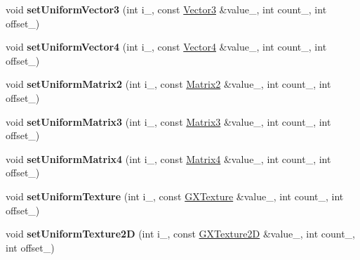 \begin{DoxyCompactItemize}
\item 
void {\bfseries set\+Uniform\+Vector3} (int i\+\_\+, const \hyperlink{class_i_dream_sky_1_1_vector3}{Vector3} \&value\+\_\+, int count\+\_, int offset\+\_)\hypertarget{class_i_dream_sky_1_1_g_x_shader_program2_ac59a30e55a0708f5f89b1f874a76ba3a}{}\label{class_i_dream_sky_1_1_g_x_shader_program2_ac59a30e55a0708f5f89b1f874a76ba3a}

\item 
void {\bfseries set\+Uniform\+Vector4} (int i\+\_\+, const \hyperlink{class_i_dream_sky_1_1_vector4}{Vector4} \&value\+\_\+, int count\+\_, int offset\+\_)\hypertarget{class_i_dream_sky_1_1_g_x_shader_program2_a884d337413d4a7d66377be2185dfb280}{}\label{class_i_dream_sky_1_1_g_x_shader_program2_a884d337413d4a7d66377be2185dfb280}

\item 
void {\bfseries set\+Uniform\+Matrix2} (int i\+\_\+, const \hyperlink{class_i_dream_sky_1_1_matrix2}{Matrix2} \&value\+\_\+, int count\+\_, int offset\+\_)\hypertarget{class_i_dream_sky_1_1_g_x_shader_program2_a992e40f8768968c0ff45bf7ce1298e68}{}\label{class_i_dream_sky_1_1_g_x_shader_program2_a992e40f8768968c0ff45bf7ce1298e68}

\item 
void {\bfseries set\+Uniform\+Matrix3} (int i\+\_\+, const \hyperlink{class_i_dream_sky_1_1_matrix3}{Matrix3} \&value\+\_\+, int count\+\_, int offset\+\_)\hypertarget{class_i_dream_sky_1_1_g_x_shader_program2_a076f2e332350fefa6f286623e1f85472}{}\label{class_i_dream_sky_1_1_g_x_shader_program2_a076f2e332350fefa6f286623e1f85472}

\item 
void {\bfseries set\+Uniform\+Matrix4} (int i\+\_\+, const \hyperlink{class_i_dream_sky_1_1_matrix4}{Matrix4} \&value\+\_\+, int count\+\_, int offset\+\_)\hypertarget{class_i_dream_sky_1_1_g_x_shader_program2_a566cb0645a0eb3df8f7e6d211d79c246}{}\label{class_i_dream_sky_1_1_g_x_shader_program2_a566cb0645a0eb3df8f7e6d211d79c246}

\item 
void {\bfseries set\+Uniform\+Texture} (int i\+\_\+, const \hyperlink{class_i_dream_sky_1_1_g_x_texture}{G\+X\+Texture} \&value\+\_\+, int count\+\_, int offset\+\_)\hypertarget{class_i_dream_sky_1_1_g_x_shader_program2_a12bb112a52cf5d169e70024acc36fe2e}{}\label{class_i_dream_sky_1_1_g_x_shader_program2_a12bb112a52cf5d169e70024acc36fe2e}

\item 
void {\bfseries set\+Uniform\+Texture2D} (int i\+\_\+, const \hyperlink{class_i_dream_sky_1_1_g_x_texture2_d}{G\+X\+Texture2D} \&value\+\_\+, int count\+\_, int offset\+\_)\hypertarget{class_i_dream_sky_1_1_g_x_shader_program2_a00ef0fbb696f26c787e7abd6800f9fbf}{}\label{class_i_dream_sky_1_1_g_x_shader_program2_a00ef0fbb696f26c787e7abd6800f9fbf}


\end{DoxyCompactItemize}
